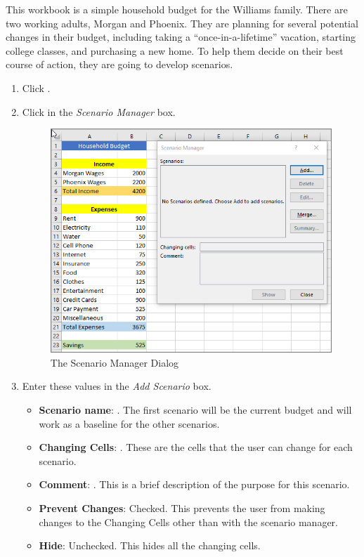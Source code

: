 This workbook is a simple household budget for the Williams family. There are two working adults, Morgan and Phoenix. They are planning for several potential changes in their budget, including taking a ``once-in-a-lifetime'' vacation, starting college classes, and purchasing a new home. To help them decide on their best course of action, they are going to develop scenarios.

\begin{enumbox}
	\begin{enumerate}
		\item Click .
		\item Click  in the \textit{Scenario Manager} box.

		\begin{figure}[H]
			\centering
			\includegraphics[width=\maxwidth{.95\linewidth}]{gfx/ch08_fig50}
			\caption{The Scenario Manager Dialog}
			\label{08:fig50}
		\end{figure}

		\item Enter these values in the \textit{Add Scenario} box.
		\begin{itemize}
			\item \textbf{Scenario name}: . The first scenario will be the current budget and will work as a baseline for the other scenarios.
			\item \textbf{Changing Cells}: . These are the cells that the user can change for each scenario.
			\item \textbf{Comment}: . This is a brief description of the purpose for this scenario.
			\item \textbf{Prevent Changes}: Checked. This prevents the user from making changes to the Changing Cells other than with the scenario manager.
			\item \textbf{Hide}: Unchecked. This hides all the changing cells.
		\end{itemize}


\end{enumerate}
\end{enumbox}
